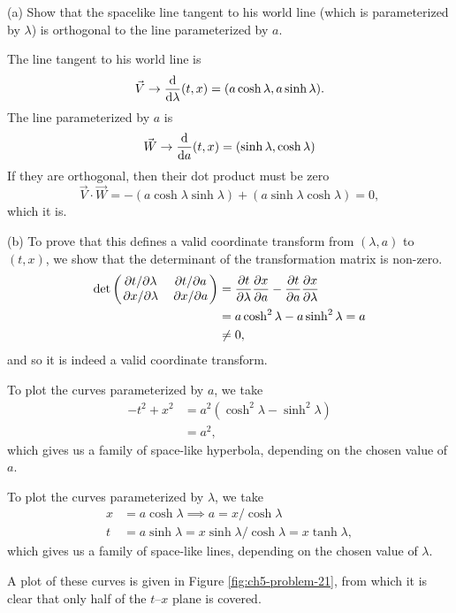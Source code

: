 \documentclass[gr-notes.tex]{subfiles}
\begin{document}
(a) Show that the spacelike line tangent to his world line (which is parameterized by $\lambda$) is orthogonal to the line parameterized by $a$.

The line tangent to his world line is
%
\begin{displaymath}
  \vec{V} \to
  \dv{\lambda} (t, x) =
  (a \cosh\lambda, a \sinh\lambda).
\end{displaymath}
%
The line parameterized by $a$ is
%
\begin{displaymath}
  \vec{W} \to
  \dv{a} (t, x) =
  (\sinh\lambda, \cosh\lambda)
\end{displaymath}
%
If they are orthogonal, then their dot product must be zero
%
\begin{displaymath}
  \vec{V} \cdot \vec{W} =
  -(a \cosh\lambda \sinh\lambda) + (a \sinh\lambda \cosh\lambda) =
  0,
\end{displaymath}
%
which it is.

(b) To prove that this defines a valid coordinate transform from $(\lambda,a)$ to $(t,x)$, we show that the determinant of the transformation matrix is non-zero.
%
\begin{align*}
  \det\mqty( \pdv*{t}{\lambda} & \pdv*{t}{a} \\
             \pdv*{x}{\lambda} & \pdv*{x}{a} ) &=
  \pdv{t}{\lambda} \pdv{x}{a} - \pdv{t}{a} \pdv{x}{\lambda}
  \\ &=
  a \cosh^2\lambda - a \sinh^2\lambda = a
  \\ &\neq 0,
\end{align*}
%
and so it is indeed a valid coordinate transform.

To plot the curves parameterized by $a$, we take
%
\begin{align*}
  -t^2 + x^2 &=
  a^2 (\cosh^2\lambda - \sinh^2\lambda)
  \\ &=
  a^2,
\end{align*}
%
which gives us a family of space-like hyperbola, depending on the chosen value of $a$.

To plot the curves parameterized by $\lambda$, we take
%
\begin{align*}
  x &= a \cosh\lambda \implies a = x / \cosh\lambda
  \\
  t &= a \sinh\lambda = x \sinh\lambda / \cosh\lambda = x \tanh\lambda,
\end{align*}
%
which gives us a family of space-like lines, depending on the chosen value of $\lambda$.

A plot of these curves is given in Figure \ref{fig:ch5-problem-21}, from which it is clear that only half of the $t$--$x$ plane is covered.
\end{document}
